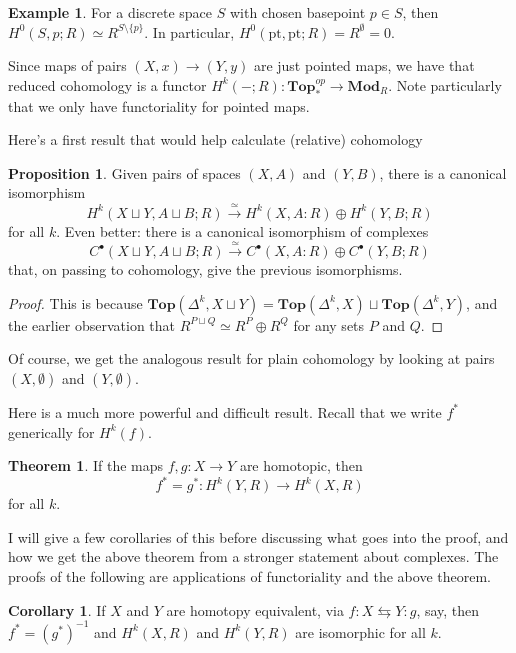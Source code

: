 \documentclass{tufte-handout}
\def\pt {\mathrm{pt}}
\def\Top {\mathbf{Top}}
\def\Mod {\mathbf{Mod}}
\theoremstyle{definition}
\newtheorem{prop}{Proposition}
\newtheorem{example}{Example}
\newtheorem{theorem}{Theorem}
\newtheorem{corollary}{Corollary}
\begin{document}
\begin{example}
For a discrete space $S$ with chosen basepoint $p\in S$, then $H^0(S,p;R) \simeq R^{S\setminus\{p\}}$.
In particular, $H^0(\pt,\pt;R) = R^\emptyset = 0$. 
\end{example}

Since maps of pairs $(X,x) \to (Y,y)$ are just pointed maps, we have that reduced cohomology is a 
functor $H^k(-;R)\colon\Top_*^{op} \to \Mod_R$. Note particularly that 
we only have functoriality for pointed maps.


Here's a first result that would help calculate (relative) cohomology

\begin{prop}
Given pairs of spaces $(X,A)$ and $(Y,B)$, there is a canonical isomorphism
\[
	H^k(X\sqcup Y,A\sqcup B;R) \xrightarrow{\simeq} H^k(X,A:R)\oplus H^k(Y,B;R)
\]
for all $k$. Even better: there is a canonical isomorphism of complexes
\[
	C^\bullet(X\sqcup Y,A\sqcup B;R) \xrightarrow{\simeq} C^\bullet(X,A:R)\oplus C^\bullet(Y,B;R)
\]
that, on passing to cohomology, give the previous isomorphisms.
\end{prop}

\begin{proof}
This is because $\Top(\Delta^k,X\sqcup Y) = \Top(\Delta^k,X)\sqcup \Top(\Delta^k,Y)$, and the 
earlier observation that $R^{P\sqcup Q} \simeq R^P\oplus R^Q$ for any sets $P$ and $Q$.
\end{proof}

Of course, we get the analogous result for plain cohomology by looking at pairs $(X,\emptyset)$ and 
$(Y,\emptyset)$.

Here is a much more powerful and difficult result. Recall that we write $f^*$ generically for $H^k(f)$.

\begin{theorem}\label{thm:homotopy_invariance_cohom}
If the maps $f,g\colon X\to Y$ are homotopic, then 
\[
	f^* = g^*\colon H^k(Y,R) \to H^k(X,R)
\]
for all $k$.
\end{theorem}

I will give a few corollaries of this before discussing what goes into the proof, and how we get the 
above theorem from a stronger statement about complexes. The proofs of the following are applications
of functoriality and the above theorem.

\begin{corollary}
If $X$ and $Y$ are homotopy equivalent, via $f\colon X\leftrightarrows Y:g$, say, then 
$f^* = (g^*)^{-1}$ and $H^k(X,R)$ and $H^k(Y,R)$ are isomorphic for all $k$.
\end{corollary}
\end{document}
